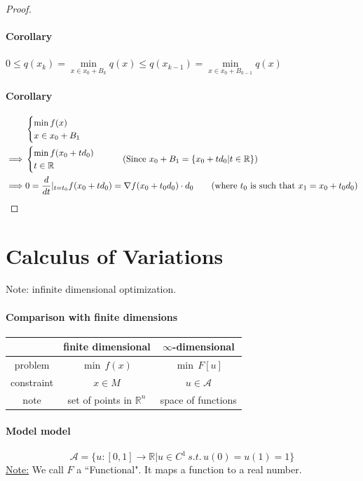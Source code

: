 \documentclass[11pt]{article}
\newcommand{\mc}[1]{\mathcal{#1}}
\newcommand{\real}[0]{\mathbb{R}}
\newcommand{\under}[1]{\underline{#1}}
\begin{document}
\begin{proof}
\paragraph{Corollary} $0 \leq q(x_{k}) = \underset{x \in x_0 + B_k}{\min} q(x) \leq q(x_{k-1}) = \underset{x \in x_0 + B_{k-1}}{\min} q(x)$
\paragraph{Corollary}
\begin{align}
&\begin{cases}
	\min f(x) \\
	x \in x_0 + B_1
\end{cases} \\
\implies &\begin{cases}
	\min f(x_0 + td_0) \\
	t \in \real
\end{cases}\tag{Since $x_0 + B_1 = \{x_0 + td_0 | t \in \real \}$} \\
\implies &0 = \frac{d}{dt}|_{t=t_0} f(x_0 + td_0) = \nabla f(x_0 + t_0d_0) \cdot d_0 \tag{where $t_0$ is such that $x_1 = x_0 + t_0 d_0$}
\end{align}
\end{proof}

\section{Calculus of Variations}
Note: infinite dimensional optimization.
\paragraph{Comparison with finite dimensions}
\begin{center}
\begin{tabular}{ |c|c|c| } 
 \hline
 & finite dimensional & $\infty$-dimensional \\
 \hline
 problem & $\min \, f(x)$ & $\min \, F[u]$ \\
 \hline
 constraint & $x \in M$ & $u \in \mathcal{A}$ \\ 
 \hline
 note & set of points in $\real^n$ & space of functions \\
 \hline
\end{tabular}
\end{center}
\paragraph{Model model}
$$\mc{A} =  \{ u: [0,1] \rightarrow \real | u \in C^1 \, s.t. \, u(0) = u(1) = 1\}$$
\under{Note:} We call $F$ a ``Functional". It maps a function to a real number.
\end{document}
